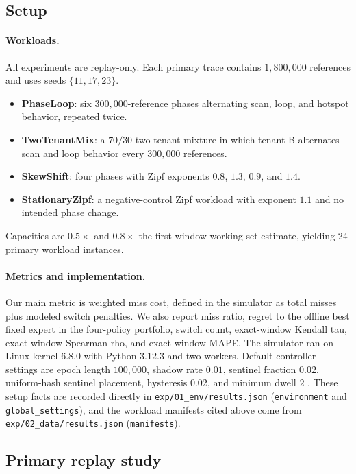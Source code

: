 \documentclass{article}
\begin{document}
\subsection{Setup}

\paragraph{Workloads.}
All experiments are replay-only. Each primary trace contains $1{,}800{,}000$ references and uses seeds $\{11,17,23\}$.
\begin{itemize}
\item \textbf{PhaseLoop}: six $300{,}000$-reference phases alternating scan, loop, and hotspot behavior, repeated twice.
\item \textbf{TwoTenantMix}: a $70/30$ two-tenant mixture in which tenant B alternates scan and loop behavior every $300{,}000$ references.
\item \textbf{SkewShift}: four phases with Zipf exponents $0.8$, $1.3$, $0.9$, and $1.4$.
\item \textbf{StationaryZipf}: a negative-control Zipf workload with exponent $1.1$ and no intended phase change.
\end{itemize}
Capacities are $0.5\times$ and $0.8\times$ the first-window working-set estimate, yielding 24 primary workload instances.

\paragraph{Metrics and implementation.}
Our main metric is weighted miss cost, defined in the simulator as total misses plus modeled switch penalties. We also report miss ratio, regret to the offline best fixed expert in the four-policy portfolio, switch count, exact-window Kendall tau, exact-window Spearman rho, and exact-window MAPE. The simulator ran on Linux kernel $6.8.0$ with Python $3.12.3$ and two workers. Default controller settings are epoch length $100{,}000$, shadow rate $0.01$, sentinel fraction $0.02$, uniform-hash sentinel placement, hysteresis $0.02$, and minimum dwell $2$ \citep{zussman2025cache,zussman2025cacheext,cao2024fetchbpf,lee2023p2cache,yelam2025pageflex}.
These setup facts are recorded directly in \texttt{exp/01\_env/results.json} (\texttt{environment} and \texttt{global\_settings}), and the workload manifests cited above come from \texttt{exp/02\_data/results.json} (\texttt{manifests}).

\subsection{Primary replay study}
\end{document}
